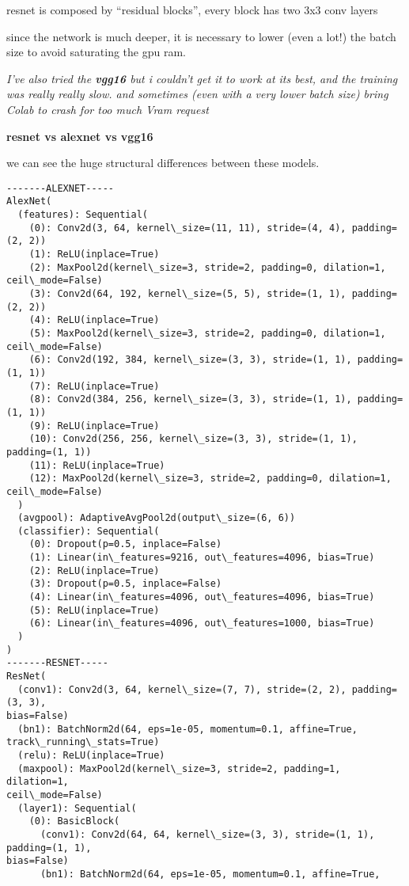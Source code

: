 \documentclass[11pt]{article}
\begin{document}
resnet is composed by ``residual blocks'', every block has two 3x3 conv
layers

since the network is much deeper, it is necessary to lower (even a lot!)
the batch size to avoid saturating the gpu ram.

\emph{I've also tried the \textbf{vgg16} but i couldn't get it to work
at its best, and the training was really really slow. and sometimes
(even with a very lower batch size) bring Colab to crash for too much
Vram request}

    \textbf{resnet vs alexnet vs vgg16}

we can see the huge structural differences between these models.

    \begin{Verbatim}[commandchars=\\\{\}]
-------ALEXNET-----
AlexNet(
  (features): Sequential(
    (0): Conv2d(3, 64, kernel\_size=(11, 11), stride=(4, 4), padding=(2, 2))
    (1): ReLU(inplace=True)
    (2): MaxPool2d(kernel\_size=3, stride=2, padding=0, dilation=1,
ceil\_mode=False)
    (3): Conv2d(64, 192, kernel\_size=(5, 5), stride=(1, 1), padding=(2, 2))
    (4): ReLU(inplace=True)
    (5): MaxPool2d(kernel\_size=3, stride=2, padding=0, dilation=1,
ceil\_mode=False)
    (6): Conv2d(192, 384, kernel\_size=(3, 3), stride=(1, 1), padding=(1, 1))
    (7): ReLU(inplace=True)
    (8): Conv2d(384, 256, kernel\_size=(3, 3), stride=(1, 1), padding=(1, 1))
    (9): ReLU(inplace=True)
    (10): Conv2d(256, 256, kernel\_size=(3, 3), stride=(1, 1), padding=(1, 1))
    (11): ReLU(inplace=True)
    (12): MaxPool2d(kernel\_size=3, stride=2, padding=0, dilation=1,
ceil\_mode=False)
  )
  (avgpool): AdaptiveAvgPool2d(output\_size=(6, 6))
  (classifier): Sequential(
    (0): Dropout(p=0.5, inplace=False)
    (1): Linear(in\_features=9216, out\_features=4096, bias=True)
    (2): ReLU(inplace=True)
    (3): Dropout(p=0.5, inplace=False)
    (4): Linear(in\_features=4096, out\_features=4096, bias=True)
    (5): ReLU(inplace=True)
    (6): Linear(in\_features=4096, out\_features=1000, bias=True)
  )
)
-------RESNET-----
ResNet(
  (conv1): Conv2d(3, 64, kernel\_size=(7, 7), stride=(2, 2), padding=(3, 3),
bias=False)
  (bn1): BatchNorm2d(64, eps=1e-05, momentum=0.1, affine=True,
track\_running\_stats=True)
  (relu): ReLU(inplace=True)
  (maxpool): MaxPool2d(kernel\_size=3, stride=2, padding=1, dilation=1,
ceil\_mode=False)
  (layer1): Sequential(
    (0): BasicBlock(
      (conv1): Conv2d(64, 64, kernel\_size=(3, 3), stride=(1, 1), padding=(1, 1),
bias=False)
      (bn1): BatchNorm2d(64, eps=1e-05, momentum=0.1, affine=True,

\end{Verbatim}
\end{document}

